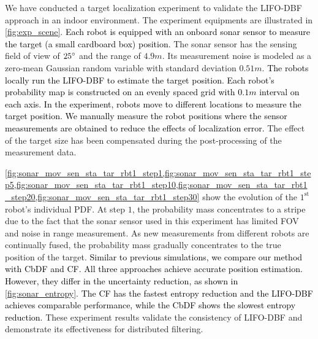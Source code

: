 \documentclass[journal]{IEEEtranTIE}
\theoremstyle{remark}
\begin{document}
	
	We have conducted a target localization experiment to validate the LIFO-DBF approach in an indoor environment.
	The experiment equipments are illustrated in \cref{fig:exp_scene}.
	\textcolor{black}{Each robot is equipped with an onboard sonar sensor to measure the target (a small cardboard box) position.}
	The sonar sensor has the sensing field of view of $25\degree$ and the range of $4.9m$.
	Its measurement noise is modeled as a zero-mean Gaussian random variable with standard deviation $0.51m$.
	\textcolor{black}{The robots locally run the LIFO-DBF to estimate the target position. Each robot's probability map is constructed on an evenly spaced grid with $0.1m$ interval on each axis.
		In the experiment, robots move to different locations to measure the target position.
		We manually measure the robot positions where the sensor measurements are obtained to reduce the effects of localization error.}
	The effect of the target size has been compensated during the post-processing of the measurement data.
	
	\cref{fig:sonar_mov_sen_sta_tar_rbt1_step1,fig:sonar_mov_sen_sta_tar_rbt1_step5,fig:sonar_mov_sen_sta_tar_rbt1_step10,fig:sonar_mov_sen_sta_tar_rbt1_step20,fig:sonar_mov_sen_sta_tar_rbt1_step30} show the evolution of the $1^\text{st}$ robot's individual PDF.
	At step $1$, the probability mass concentrates to a stripe due to the fact that the sonar sensor used in this experiment has limited FOV and noise in range measurement.
	As new measurements from different robots are continually fused, the probability mass gradually concentrates to the true position of the target. 
	\textcolor{black}{Similar to previous simulations, we compare our method with CbDF and CF.
		All three approaches achieve accurate position estimation.
		However, they differ in the uncertainty reduction, as shown in \cref{fig:sonar_entropy}.
		The CF has the fastest entropy reduction and the LIFO-DBF achieves comparable performance, while the CbDF shows the slowest entropy reduction.}
	These experiment results validate the consistency of LIFO-DBF and demonstrate its effectiveness for distributed filtering.
	
\end{document}
